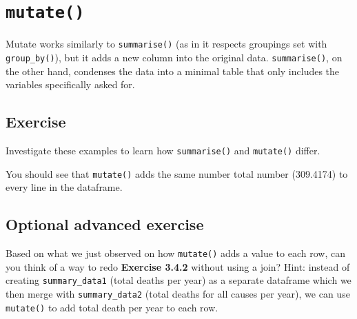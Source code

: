 \documentclass[]{book}
\makeatletter
\newenvironment{Shaded}{\begin{snugshade}}{\end{snugshade}}
\newcommand{\DataTypeTok}[1]{\textcolor[rgb]{0.13,0.29,0.53}{#1}}
\newcommand{\KeywordTok}[1]{\textcolor[rgb]{0.13,0.29,0.53}{\textbf{#1}}}
\newcommand{\NormalTok}[1]{#1}
\newcommand{\OperatorTok}[1]{\textcolor[rgb]{0.81,0.36,0.00}{\textbf{#1}}}
\newcommand{\StringTok}[1]{\textcolor[rgb]{0.31,0.60,0.02}{#1}}
\newenvironment{kframe}{%
\medskip{}
\setlength{\fboxsep}{.8em}
 \def\at@end@of@kframe{}%
 \ifinner\ifhmode%
  \def\at@end@of@kframe{\end{minipage}}%
  \begin{minipage}{\columnwidth}%
 \fi\fi%
 \def\FrameCommand##1{\hskip\@totalleftmargin \hskip-\fboxsep
 \colorbox{shadecolor}{##1}\hskip-\fboxsep
     \hskip-\linewidth \hskip-\@totalleftmargin \hskip\columnwidth}%
 \MakeFramed {\advance\hsize-\width
   \@totalleftmargin\z@ \linewidth\hsize
   \@setminipage}}%
 {\par\unskip\endMakeFramed%
 \at@end@of@kframe}
\renewenvironment{Shaded}{\begin{kframe}}{\end{kframe}}
\theoremstyle{definition}
\theoremstyle{definition}
\theoremstyle{definition}
\theoremstyle{remark}
\makeatother
\begin{document}
\hypertarget{mutate}{%
\section{\texorpdfstring{\texttt{mutate()}}{mutate()}}\label{mutate}}

Mutate works similarly to \texttt{summarise()} (as in it respects
groupings set with \texttt{group\_by()}), but it adds a new column into
the original data. \texttt{summarise()}, on the other hand, condenses
the data into a minimal table that only includes the variables
specifically asked for.

\hypertarget{exercise-13}{%
\subsection{Exercise}\label{exercise-13}}

Investigate these examples to learn how \texttt{summarise()} and
\texttt{mutate()} differ.

\begin{Shaded}
\end{Shaded}

You should see that \texttt{mutate()} adds the same number total number
(309.4174) to every line in the dataframe.

\hypertarget{optional-advanced-exercise}{%
\subsection{Optional advanced
exercise}\label{optional-advanced-exercise}}

Based on what we just observed on how \texttt{mutate()} adds a value to
each row, can you think of a way to redo \textbf{Exercise 3.4.2} without
using a join? Hint: instead of creating \texttt{summary\_data1} (total
deaths per year) as a separate dataframe which we then merge with
\texttt{summary\_data2} (total deaths for all causes per year), we can
use \texttt{mutate()} to add total death per year to each row.
\end{document}
